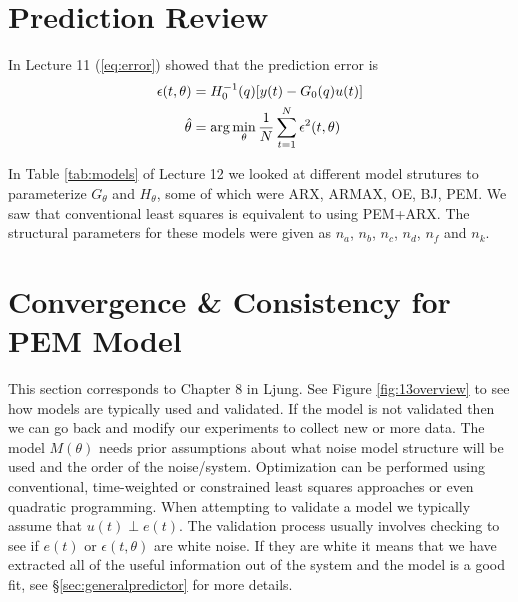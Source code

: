 
\mainmatter
\setcounter{page}{1}

\lectureseries[\course]{\course}

\date{November 10, 2009}

\setaddress

\setcounter{lecture}{12}
\setcounter{chapter}{12}


\section{Prediction Review}
In Lecture 11 (\ref{eq:error}) showed that the prediction error is
\begin{align*}
\epsilon(t,\theta) &= H_0^{-1}(q)[y(t)-G_0(q)u(t)] \\
\hat{\theta} &= \arg\min_\theta\frac{1}{N}\sum_{t=1}^N\epsilon^2(t,\theta)
\end{align*}

In Table \ref{tab:models} of Lecture 12 we looked at different model strutures to parameterize $G_\theta$ and $H_\theta$, some of which were ARX, ARMAX, OE, BJ, PEM. We saw that conventional least squares is equivalent to using PEM+ARX.  The structural parameters for these models were given as $n_a$, $n_b$, $n_c$, $n_d$, $n_f$ and $n_k$.

\section{Convergence \& Consistency for PEM Model}
\label{sec:13convergence}
This section corresponds to Chapter 8 in Ljung. See Figure \ref{fig:13overview} to see how models are typically used and validated. If the model is not validated then we can go back and modify our experiments to collect new or more data. The model $M(\theta)$ needs prior assumptions about what noise model structure will be used and the order of the noise/system. Optimization can be performed using conventional, time-weighted or constrained least squares approaches or even quadratic programming. When attempting to validate a model we typically assume that $u(t)\perp e(t)$. The validation process usually involves checking to see if $e(t)$ or $\epsilon(t,\theta)$ are white noise. If they are white it means that we have extracted all of the useful information out of the system and the model is a good fit, see \S\ref{sec:generalpredictor} for more details.

